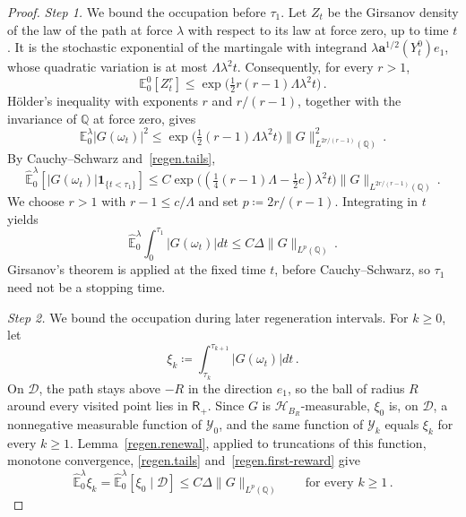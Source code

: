 \documentclass[11pt]{amsart}
\theoremstyle{definition}
\theoremstyle{remark}
\numberwithin{equation}{section}
\newcommand{\Q}{\mathbb Q}
\renewcommand{\a}{\mathbf a}
\begin{document}
\begin{proof}
\emph{Step 1.} We bound the occupation before $\tau_1$. Let $Z_t$ be the Girsanov density of the law of the path at force $\lambda$ with respect to its law at force zero, up to time $t$. It is the stochastic exponential of the martingale with integrand $\lambda\a^{1/2}(Y^0_t)e_1$, whose quadratic variation is at most $\Lambda\lambda^2t$. Consequently, for every $r>1$,
\begin{equation*}
 \mathbb E^0_0[Z_t^r]
 \leq\exp\big(\tfrac12r(r-1)\Lambda\lambda^2t\big)\, .
\end{equation*}
H\"older's inequality with exponents $r$ and $r/(r-1)$, together with the invariance of $\Q$ at force zero, gives
\begin{equation*}
 \mathbb E^\lambda_0|G(\omega_t)|^2
 \leq\exp\big(\tfrac12(r-1)\Lambda\lambda^2t\big)
 \|G\|_{L^{2r/(r-1)}(\Q)}^2\, .
\end{equation*}
By Cauchy--Schwarz and~\eqref{regen.tails},
\begin{equation*}
 \widehat{\mathbb E}^\lambda_0[
 |G(\omega_t)|\mathbf1_{\{t<\tau_1\}}]
 \leq C\exp\big((\tfrac14(r-1)\Lambda-\tfrac12c)\lambda^2t\big)
 \|G\|_{L^{2r/(r-1)}(\Q)}\, .
\end{equation*}
We choose $r>1$ with $r-1\leq c/\Lambda$ and set $p\coloneqq2r/(r-1)$. Integrating in $t$ yields
\begin{equation}\label{regen.first-reward}
 \widehat{\mathbb E}^\lambda_0\int_0^{\tau_1}|G(\omega_t)|dt
 \leq C\Delta\|G\|_{L^p(\Q)}\, .
\end{equation}
Girsanov's theorem is applied at the fixed time $t$, before Cauchy--Schwarz, so $\tau_1$ need not be a stopping time.

\emph{Step 2.} We bound the occupation during later regeneration intervals. For $k\geq0$, let
\begin{equation*}
 \xi_k\coloneqq\int_{\tau_k}^{\tau_{k+1}}|G(\omega_t)|dt\, .
\end{equation*}
On $\mathcal D$, the path stays above $-R$ in the direction $e_1$, so the ball of radius $R$ around every visited point lies in $\mathsf R_+$. Since $G$ is $\mathcal H_{B_R}$-measurable, $\xi_0$ is, on $\mathcal D$, a nonnegative measurable function of $\mathcal Y_0$, and the same function of $\mathcal Y_k$ equals $\xi_k$ for every $k\geq1$. Lemma~\ref{regen.renewal}, applied to truncations of this function, monotone convergence, \eqref{regen.tails} and~\eqref{regen.first-reward} give
\begin{equation*}
 \widehat{\mathbb E}^\lambda_0 \xi_k
 =\widehat{\mathbb E}^\lambda_0[\xi_0\mid\mathcal D]
 \leq C\Delta\|G\|_{L^p(\Q)}
 \qquad\text{for every }k\geq1\, .
\end{equation*}


\end{proof}
\end{document}
